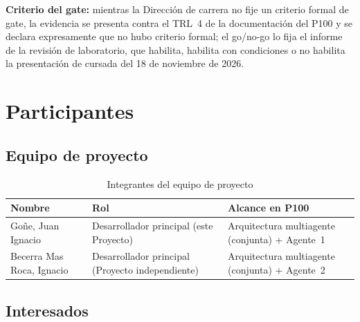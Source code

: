 \documentclass[a4paper, 12pt]{article}
\begin{document}
\noindent\textbf{Criterio del gate:} mientras la Direcci\'on de carrera no fije un criterio formal de gate, la evidencia se presenta contra el \ac{TRL}~4 de la documentaci\'on del \ac{P100} y se declara expresamente que no hubo criterio formal; el go/no-go lo fija el informe de la revisi\'on de laboratorio, que habilita, habilita con condiciones o no habilita la presentaci\'on de cursada del 18 de noviembre de 2026.

\section{Participantes}

\subsection{Equipo de proyecto}

\begin{table}[H]
  \centering
  \caption{Integrantes del equipo de proyecto}
  \label{tab:equipo}
  \footnotesize
  \begin{tabularx}{\textwidth}{L{0.25\textwidth}L{0.30\textwidth}Y}
    \toprule
    \textbf{Nombre} & \textbf{Rol} & \textbf{Alcance en P100} \\
    \midrule
    Go\~ne, Juan Ignacio       & Desarrollador principal (este Proyecto) & Arquitectura multiagente (conjunta) + Agente~1 \\
    Becerra Mas Roca, Ignacio  & Desarrollador principal (Proyecto independiente) & Arquitectura multiagente (conjunta) + Agente~2 \\
    \bottomrule
  \end{tabularx}
\end{table}

\subsection{Interesados}
\end{document}
